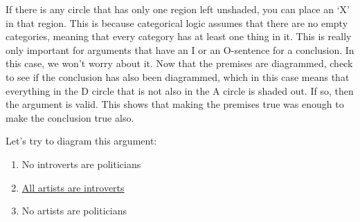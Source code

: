 



If there is any circle that has only one region left unshaded, you can place an `X' in that region. This is because categorical logic assumes that there are no empty categories, meaning that every category has at least one thing in it. This is really only important for arguments that have an I or an O-sentence for a conclusion. In this case, we won't worry about it.  Now that the premises are diagrammed, check to see if the conclusion has also been diagrammed, which in this case means that everything in the D circle that is not also in the A circle is shaded out. If so, then the argument is valid. This shows that making the premises true was enough to make the conclusion true also.

Let's try to diagram this argument:

\begin{enumerate}
\item No introverts are politicians 
\item \underline{All artists are introverts}
\item No artists are politicians
\end{enumerate}



